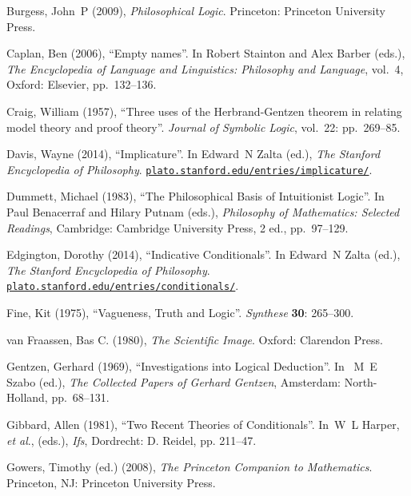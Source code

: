 \documentclass[openany,leqno,10pt]{book}
\theoremstyle{break}
\theoremstyle{definition}
\theoremstyle{remark}
\begin{document}
{\begin{thebibliography}{39}
Burgess, John~P (2009), \emph{Philosophical Logic}. Princeton: Princeton
  University Press.

Caplan, Ben (2006), \enquote{Empty names}. In Robert Stainton and Alex Barber
  (eds.), \emph{The Encyclopedia of Language and Linguistics: Philosophy and
  Language}, vol.~4, Oxford: Elsevier, pp.~132–136.

Craig, William (1957), \enquote{Three uses of the Herbrand-Gentzen theorem in
  relating model theory and proof theory}. \emph{Journal of Symbolic Logic},
  vol.~22: pp.~269–85.

Davis, Wayne (2014), \enquote{Implicature}. In Edward~N Zalta (ed.), \emph{The Stanford Encyclopedia of Philosophy}. \urlprefix\href{http://plato.stanford.edu/entries/implicature/}{\nolinkurl{plato.stanford.edu/entries/implicature/}}.

Dummett, Michael (1983), \enquote{The Philosophical Basis of Intuitionist
  Logic}. In Paul Benacerraf and Hilary Putnam (eds.), \emph{Philosophy of
  Mathematics: Selected Readings}, Cambridge: Cambridge University Press, 2
  ed., pp.~97–129.

Edgington, Dorothy (2014), \enquote{Indicative Conditionals}. In Edward~N Zalta (ed.), \emph{The Stanford Encyclopedia of Philosophy}. \urlprefix\href{http://plato.stanford.edu/entries/conditionals/}{\nolinkurl{plato.stanford.edu/entries/conditionals/}}.

Fine, Kit (1975), \enquote{Vagueness, Truth and Logic}. \emph{Synthese} \textbf{30}: 265–300.

van Fraassen, Bas C. (1980), \emph{The Scientific Image}. Oxford: Clarendon Press.

Gentzen, Gerhard (1969), \enquote{Investigations into Logical Deduction}. In
 ~M~E Szabo (ed.), \emph{The Collected Papers of Gerhard Gentzen},
  Amsterdam: North-Holland, pp.~68–131.

Gibbard, Allen (1981), \enquote{Two Recent Theories of Conditionals}. In~W~L Harper, \emph{et al}., (eds.), \emph{Ifs}, Dordrecht: D. Reidel, pp. 211–47.

Gowers, Timothy (ed.) (2008), \emph{The Princeton Companion to Mathematics}. Princeton, NJ: Princeton University Press.


\end{thebibliography}}
\end{document}
